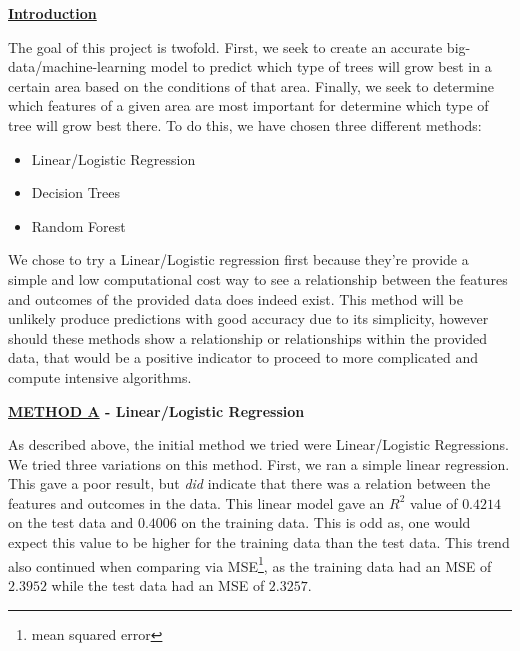 \documentclass{article}[12pt]
\numberwithin{equation}{subsection}
\begin{document}
\begin{flushleft}


\begin{large} \textbf{\underline{Introduction}} \end{large}

The goal of this project is twofold.  First, we seek to create an accurate big-data/machine-learning model to predict which type of trees will grow best in a certain area based on the conditions of that area.  Finally, we seek to determine which features of a given area are most important for determine which type of tree will grow best there.  To do this, we have chosen three different methods:

\begin{itemize}
\item Linear/Logistic Regression
\item Decision Trees
\item Random Forest
\end{itemize}

We chose to try a Linear/Logistic regression first because they're provide a simple and low computational cost way to see a relationship between the features and outcomes of the provided data does indeed exist.  This method will be unlikely produce predictions with good accuracy due to its simplicity, however should these methods show a relationship or relationships within the provided data, that would be a positive indicator to proceed to more complicated and compute intensive algorithms.


\vspace{1.25in}

\begin{large} \textbf{\underline{METHOD A} - Linear/Logistic Regression} \end{large}

As described above, the initial method we tried were Linear/Logistic Regressions.  We tried three variations on this method.  First, we ran a simple linear regression.  This gave a poor result, but \emph{did} indicate that there was a relation between the features and outcomes in the data.  This linear model gave an $R^2$ value of $0.4214$ on the test data and $0.4006$ on the training data.  This is odd as, one would expect this value to be higher for the training data than the test data.  This trend also continued when comparing via MSE\footnote{mean squared error}, as the training data had an MSE of $2.3952$ while the test data had an MSE of $2.3257$.  \newline


\end{flushleft}
\end{document}
